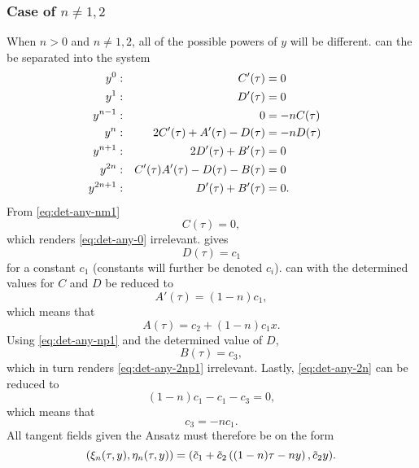 \subsubsection{Case of \texorpdfstring{\(n\neq1,2\)}{n not 1 or 2}}

When \(n>0\) and \(n\neq1,2\), all of the possible powers of \(y\) will be different.
 can the be separated into the system
\begin{subequations}
  \begin{flalign}
    y^0:      && C'(\tau) &= 0                               &&\FlLabel{eq:det-any-0}\\
    y^1:      && D'(\tau) &= 0                               &&\FlLabel{eq:det-any-1} \\
    y^{n-1}:  && 0 &= -nC(\tau)                              &&\FlLabel{eq:det-any-nm1} \\
    y^n:      && 2C'(\tau) + A'(\tau) - D(\tau) &= -nD(\tau) &&\FlLabel{eq:det-any-n} \\
    y^{n+1}:  && 2D'(\tau) + B'(\tau) &= 0                   &&\FlLabel{eq:det-any-np1} \\
    y^{2n}:   && C'(\tau) A'(\tau) - D(\tau) - B(\tau) &= 0  &&\FlLabel{eq:det-any-2n} \\
    y^{2n+1}: && D'(\tau) + B'(\tau) &= 0.                   &&\FlLabel{eq:det-any-2np1}
  \end{flalign}
\end{subequations}
From \cref{eq:det-any-nm1}
\begin{equation}
  C(\tau) = 0,
\end{equation}
which renders \cref{eq:det-any-0} irrelevant.
 gives
\begin{equation}
  D(\tau) = c_1
\end{equation}
for a constant \(c_1\) (constants will further be denoted \(c_i\)).
 can with the determined values for \(C\) and \(D\) be reduced to
\begin{equation}
  A'(\tau) = (1-n) c_1,
\end{equation}
which means that
\begin{equation}
  A(\tau) = c_2 + (1-n) c_1 x.
\end{equation}
Using \cref{eq:det-any-np1} and the determined value of \(D\),
\begin{equation}
  B(\tau) = c_3,
\end{equation}
which in turn renders \cref{eq:det-any-2np1} irrelevant.
Lastly, \cref{eq:det-any-2n} can be reduced to
\begin{equation}
  (1-n) c_1 - c_1 - c_3 = 0,
\end{equation}
which means that
\begin{equation}
  c_3 = -n c_1.
\end{equation}
All tangent fields given the Ansatz must therefore be on the form
\begin{equation} \label{eq:hill-tangent-field-any}
  \pqty{\xi_n(\tau,y),\eta_n(\tau,y)} = 
  \pqty{\tilde{c}_1 + \tilde{c}_2 \left( (1-n) \tau - n y \right), \tilde{c}_2 y}.
\end{equation}

